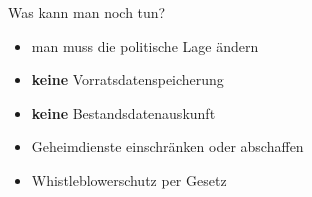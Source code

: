 \begin{frame}{Was kann man noch tun?}
  \begin{itemize}
    \item man muss die politische Lage ändern
    \item \textbf{keine} Vorratsdatenspeicherung
    \item \textbf{keine} Bestandsdatenauskunft
    \item Geheimdienste einschränken oder abschaffen
    \item Whistleblowerschutz per Gesetz
  \end{itemize}


\end{frame}

